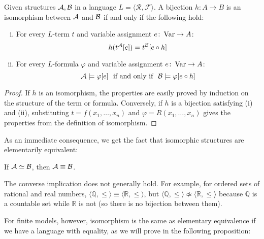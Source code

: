 \begin{proposition}
Given structures $\mathcal{A}, \mathcal{B}$ in a language $L = \langle\mathcal{R}, \mathcal{F}\rangle$. A bijection $h\colon A \to B$ is an isomorphism between $\mathcal{A}$ and $\mathcal{B}$ if and only if the following hold:
\begin{enumerate}[(i)]
    \item For every $L$-term $t$ and variable assignment $e\colon \operatorname{Var} \to A$:
    $$
    h(t^{\mathcal{A}}[e]) = t^{\mathcal{B}}[e \circ h]
    $$
    \item For every $L$-formula $\varphi$ and variable assignment $e\colon \operatorname{Var} \to A$:
    $$
    \mathcal{A} \models \varphi[e]\ \text{ if and only if }\ \mathcal{B} \models \varphi[e \circ h]
    $$
\end{enumerate}
\end{proposition}
\begin{proof}
    If $h$ is an isomorphism, the properties are easily proved by induction on the structure of the term or formula. Conversely, if $h$ is a bijection satisfying (i) and (ii), substituting $t = f(x_1, \dots, x_n)$ and $\varphi = R(x_1, \dots, x_n)$ gives the properties from the definition of isomorphism.
\end{proof}

As an immediate consequence, we get the fact that isomorphic structures are elementarily equivalent:

\begin{corollary}\label{corollary:isomorphic-implies-elementarily-equivalent}
    If $\mathcal{A} \simeq \mathcal{B}$, then $\mathcal{A} \equiv \mathcal{B}$.
\end{corollary}

\begin{remark}
    The converse implication does not generally hold. For example, for ordered sets of rational and real numbers, $\langle\mathbb{Q}, \leq \rangle \equiv \langle\mathbb{R}, \leq \rangle$, but $\langle\mathbb{Q}, \leq \rangle \not\simeq \langle \mathbb{R}, \leq \rangle$ because $\mathbb{Q}$ is a countable set while $\mathbb{R}$ is not (so there is no bijection between them).
\end{remark}

For finite models, however, isomorphism is the same as elementary equivalence if we have a language with equality, as we will prove in the following proposition:

